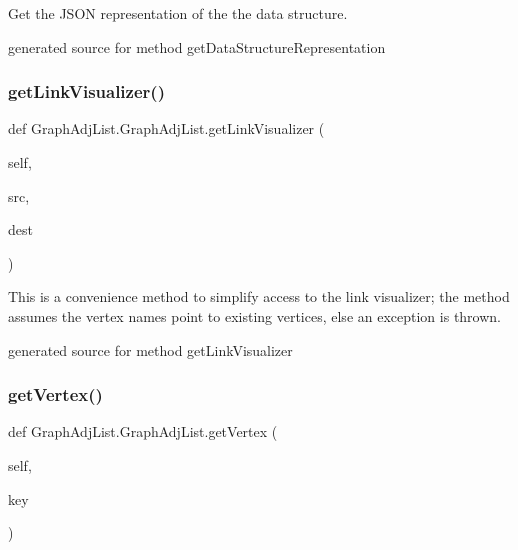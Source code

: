 Get the J\+S\+ON representation of the the data structure. 

\begin{DoxyVerb}generated source for method getDataStructureRepresentation \end{DoxyVerb}
 \hypertarget{class_graph_adj_list_1_1_graph_adj_list_ac8e04d8c44a0a7f117e38215c593845e}{}\label{class_graph_adj_list_1_1_graph_adj_list_ac8e04d8c44a0a7f117e38215c593845e} 
\subsubsection{\texorpdfstring{get\+Link\+Visualizer()}{getLinkVisualizer()}}
{\footnotesize\ttfamily def Graph\+Adj\+List.\+Graph\+Adj\+List.\+get\+Link\+Visualizer (\begin{DoxyParamCaption}\item[{}]{self,  }\item[{}]{src,  }\item[{}]{dest }\end{DoxyParamCaption})}



This is a convenience method to simplify access to the link visualizer; the method assumes the vertex names point to existing vertices, else an exception is thrown. 

\begin{DoxyVerb}generated source for method getLinkVisualizer \end{DoxyVerb}
 \hypertarget{class_graph_adj_list_1_1_graph_adj_list_a8f0e2f62373963562f2c28bfb1513bc1}{}\label{class_graph_adj_list_1_1_graph_adj_list_a8f0e2f62373963562f2c28bfb1513bc1} 
\subsubsection{\texorpdfstring{get\+Vertex()}{getVertex()}}
{\footnotesize\ttfamily def Graph\+Adj\+List.\+Graph\+Adj\+List.\+get\+Vertex (\begin{DoxyParamCaption}\item[{}]{self,  }\item[{}]{key }\end{DoxyParamCaption})}



